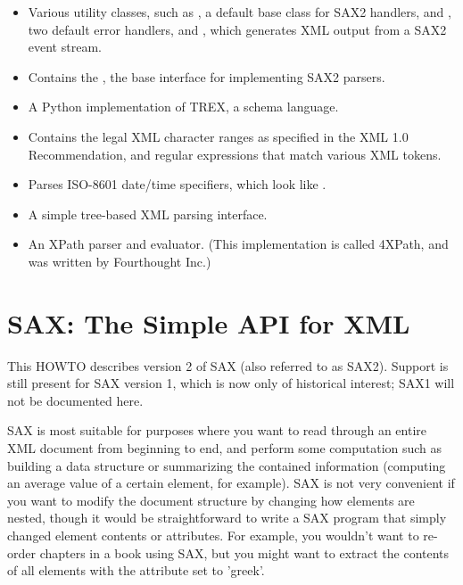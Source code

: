 \documentclass{howto}
\newcommand{\element}[1]{\code{#1}}
\newcommand{\attribute}[1]{\code{#1}}
\begin{document}
\begin{itemize}
\item[\module{sax.saxutils}]
  Various utility classes, such as , a default
  base class for SAX2 handlers,  and
  , two default error handlers, and
  , which generates XML output from a SAX2 event stream.
  
\item[\module{sax.xmlreader}]
  Contains the , the base interface for implementing 
  SAX2 parsers.

\item[\module{xml.schema.trex}]
  A Python implementation of TREX, a schema language.

\item[\module{xml.utils.characters}]
  Contains the legal XML character ranges as specified in the XML 1.0
  Recommendation, and regular expressions that match various
  XML tokens.
  
\item[\module{xml.utils.iso8601}]
  Parses ISO-8601 date/time specifiers, which look like 
  .
  
\item[\module{xml.utils.qp_xml}]
  A simple tree-based XML parsing interface.  

\item[\module{xml.xpath}]
  An XPath parser and evaluator.
  (This implementation is called 4XPath, and was written by Fourthought Inc.)

\begin{comment}
\item[\module{xml.xslt}] 
   An implementation of the XSLT transformation language.
  (This implementation is called 4XSLT, and was written by Fourthought Inc.)
\end{comment}

\end{itemize}


\section{SAX: The Simple API for XML\label{section-SAX}}


This HOWTO describes version 2 of SAX (also referred to as SAX2).
Support is still present for SAX version 1, which is now only of
historical interest; SAX1 will not be documented here.

SAX is most suitable for purposes where you want to read through an
entire XML document from beginning to end, and perform some
computation such as building a data structure or summarizing the
contained information (computing an average value of a certain
element, for example).  SAX is not very convenient if you want to
modify the document structure by changing how elements are nested,
though it would be straightforward to write a SAX program that simply
changed element contents or attributes.  For example, you wouldn't
want to re-order chapters in a book using SAX, but you might want to
extract the contents of all \element{name} elements with the attribute
\attribute{lang} set to 'greek'.
\end{document}

